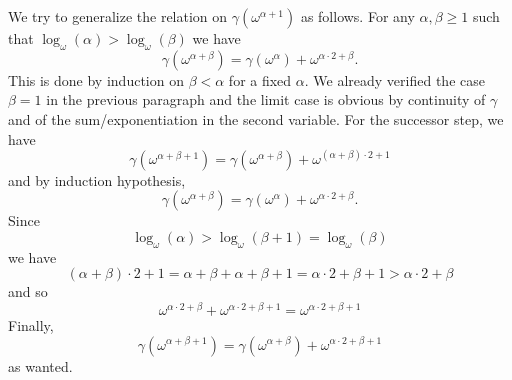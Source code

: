 We try to generalize the relation on
\(\gamma(\omega^{\alpha+1})\)
as follows. For any \(\alpha, \beta \geq 1\) such that
\(\log_{\omega}(\alpha) > \log_{\omega}(\beta)\)
we have
\begin{equation*}
\gamma(\omega^{\alpha+\beta})
  = \gamma(\omega^{\alpha}) + \omega^{\alpha\cdot 2 + \beta}.
\end{equation*}
This is done by induction on \(\beta < \alpha\) for a fixed \(\alpha\).
We already verified the case \(\beta = 1\) in
the previous paragraph and the limit case is obvious by continuity
of \(\gamma\) and of the sum/exponentiation in the second variable.
For the successor step, we have
\begin{equation*}
\gamma(\omega^{\alpha+\beta + 1})
  = {\gamma(\omega^{\alpha + \beta})} + \omega^{{(\alpha + \beta)}\cdot 2 + 1}
\end{equation*}
and by induction hypothesis,
\begin{equation*}
\gamma(\omega^{\alpha+\beta})
  = \gamma(\omega^{\alpha}) + \omega^{\alpha\cdot 2 + \beta}.
\end{equation*}
Since
\begin{equation*}
\log_{\omega}(\alpha) > \log_{\omega}(\beta + 1) = \log_{\omega}(\beta)
\end{equation*}
we have
\begin{equation*}
(\alpha+\beta)\cdot 2 + 1
  = \alpha+\beta + \alpha+\beta + 1 = \alpha\cdot 2 + \beta + 1 >
  \alpha\cdot 2 + \beta
\end{equation*}
and so
\begin{equation*}
\omega^{\alpha\cdot 2 + \beta} + \omega^{\alpha\cdot 2 + \beta + 1}
  = \omega^{\alpha\cdot 2 + \beta + 1}
\end{equation*}
Finally,
\begin{equation*}
{\gamma(\omega^{\alpha + \beta + 1})}
  = {\gamma(\omega^{\alpha + \beta})} + \omega^{\alpha\cdot 2 + \beta + 1}
\end{equation*}
as wanted.


